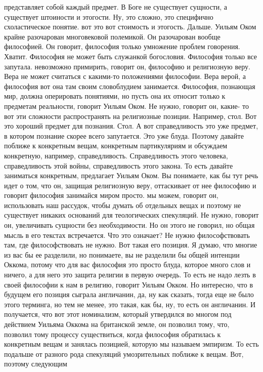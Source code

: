 представляет собой каждый предмет. В Боге не существует сущности, а существует
штоиности и этогости. Ну, это сложно, это специфично схоластическое понятие. вот
это вот стоимость и этогость. Дальше. Уильям Оком крайне разочарован
многовековой полемикой. Он разочарован вообще философией. Он говорит, философия
только умножение проблем говорения. Хватит. Философия не может быть служанкой
богословия. Философия только все запутала. невозможно примирить, говорит он,
философию и религиозную веру. Вера не может считаться с какими-то положениями
философии. Вера верой, а философия вот она там своим словоблудием занимается.
Философия, познающая мир, должна оперировать понятиями, но пусть она их относит
только к предметам реальности, говорит Уильям Оком. Не нужно, говорит он, какие-
то вот эти сложности распространять на религиозные позиции. Например, стол. Вот
это хороший предмет для познания. Стол. А вот справедливость это уже предмет, в
котором познание скорее всего запутается. Это уже блуда. Поэтому давайте поближе
к конкретным вещам, конкретным партикуляриям и обсуждаем конкретную, например,
справедливость. Справедливость этого человека, справедливость этой войны,
справедливость этого закона. То есть давайте заниматься конкретным, предлагает
Уильям Оком. Вы понимаете, как бы тут речь идет о том, что он, защищая
религиозную веру, оттаскивает от нее философию и говорит философия занимайся
миром просто. мы можем, говорит он, использовать наш рассудок, чтобы думать об
отдельных вещах и поэтому не существует никаких оснований для теологических
спекуляций. Не нужно, говорит он, увеличивать сущности без необходимости. Но он
этого не говорил, но общая мысль в его текстах встречается. Что это означает? Не
нужно философствовать там, где философствовать не нужно. Вот такая его позиция.
Я думаю, что многие из вас бы ее разделили, но понимаете, вы не разделили бы
общей интенции Оккома, потому что для вас философия это просто блуда, которое
много слов и ничего, а для него это защита религии в первую очередь. То есть не
надо лезть в своей философии к нам в религию, говорит Уильям Окком. Но
интересно, что в будущем его позиция сыграла англичанин, да, ну как сказать,
тогда еще не было этого терминга, но тем не менее, это такая, как бы, ну, то
есть он англичанин. И получается, что вот этот номинализм, который утвердился во
многом под действием Уильяма Оккома на британской земле, он позволил тому, что,
позволил тому процессу существиться, когда философия обратилась к конкретным
вещам и занялась позицией, которую мы называем эмпиризм. То есть подальше от
разного рода спекуляций умозрительных поближе к вещам. Вот, поэтому следующим
